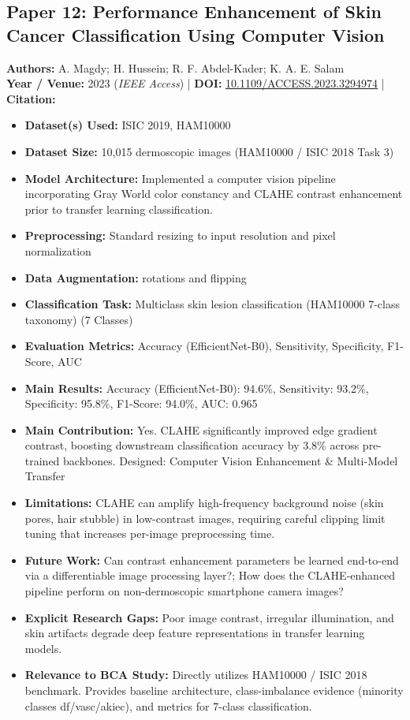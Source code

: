 \documentclass[11pt,a4paper]{article}
\begin{document}
\subsection{Paper 12: Performance Enhancement of Skin Cancer Classification Using Computer Vision}
\textbf{Authors:} A. Magdy; H. Hussein; R. F. Abdel-Kader; K. A. E. Salam \\
\textbf{Year / Venue:} 2023 (\textit{IEEE Access}) | \textbf{DOI:} \href{https://doi.org/10.1109/ACCESS.2023.3294974}{10.1109/ACCESS.2023.3294974} | \textbf{Citation:} \cite{10181245}

\begin{itemize}\small
\item \textbf{Dataset(s) Used:} ISIC 2019, HAM10000
\item \textbf{Dataset Size:} 10,015 dermoscopic images (HAM10000 / ISIC 2018 Task 3)
\item \textbf{Model Architecture:} Implemented a computer vision pipeline incorporating Gray World color constancy and CLAHE contrast enhancement prior to transfer learning classification.
\item \textbf{Preprocessing:} Standard resizing to input resolution and pixel normalization
\item \textbf{Data Augmentation:} rotations and flipping
\item \textbf{Classification Task:} Multiclass skin lesion classification (HAM10000 7-class taxonomy) (7 Classes)
\item \textbf{Evaluation Metrics:} Accuracy (EfficientNet-B0), Sensitivity, Specificity, F1-Score, AUC
\item \textbf{Main Results:} Accuracy (EfficientNet-B0): 94.6\%, Sensitivity: 93.2\%, Specificity: 95.8\%, F1-Score: 94.0\%, AUC: 0.965
\item \textbf{Main Contribution:} Yes. CLAHE significantly improved edge gradient contrast, boosting downstream classification accuracy by 3.8\% across pre-trained backbones. Designed: Computer Vision Enhancement \& Multi-Model Transfer
\item \textbf{Limitations:} CLAHE can amplify high-frequency background noise (skin pores, hair stubble) in low-contrast images, requiring careful clipping limit tuning that increases per-image preprocessing time.
\item \textbf{Future Work:} Can contrast enhancement parameters be learned end-to-end via a differentiable image processing layer?; How does the CLAHE-enhanced pipeline perform on non-dermoscopic smartphone camera images?
\item \textbf{Explicit Research Gaps:} Poor image contrast, irregular illumination, and skin artifacts degrade deep feature representations in transfer learning models.
\item \textbf{Relevance to BCA Study:} Directly utilizes HAM10000 / ISIC 2018 benchmark. Provides baseline architecture, class-imbalance evidence (minority classes df/vasc/akiec), and metrics for 7-class classification.
\end{itemize}
\end{document}
